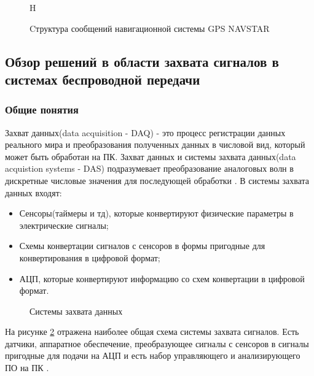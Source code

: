 \begin{figure}{H}
\begin{center}
\end{center}
\caption{Cтруктура сообщений навигационной системы GPS NAVSTAR}
\label{pic:gps_data_format}
\end{figure}

\subsection{Обзор решений в области захвата сигналов в системах беспроводной передачи}
\label{razdel12}
\subsubsection{Общие понятия}
Захват данных(data acquisition - DAQ) - это процесс регистрации данных реального мира и преобразования полученных данных в 
числовой вид, который может быть обработан на ПК. Захват данных и системы захвата данных(data acquistion systems - DAS) подразумевает
преобразование аналоговых волн в дискретные числовые значения для последующей обработки \cite{ni_acq}. В системы захвата данных входят:

\begin{itemize}
\item Сенсоры(таймеры и тд), которые конвертируют физические параметры в электрические сигналы;
\item Схемы конвертации сигналов с сенсоров в формы пригодные для конвертирования в цифровой формат;
\item АЦП, которые конвертируют информацию со схем конвертации в цифровой формат.
\end{itemize}

\begin{figure}[H]
\caption{Системы захвата данных}
\label{pic_acq}
\end{figure}

На рисунке \ref{pic_acq} отражена наиболее общая схема системы захвата сигналов. Есть датчики, аппаратное обеспечение,
преобразующее сигналы с сенсоров в сигналы пригодные для подачи на АЦП и есть набор управляющего и анализирующего ПО
на ПК \cite{ni_acq}.

